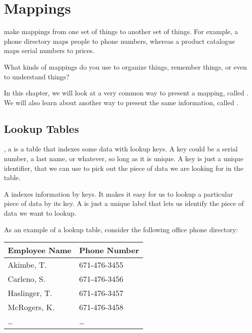 \documentclass[../../../main.tex]{subfiles}
\begin{document}
\chapter{Mappings}

 make mappings from one set of things to another set of things. For example, a phone directory maps people to phone numbers, whereas a product catalogue maps serial numbers to prices.

\begin{ponder}
  What kinds of mappings do you use to organize things, remember things, or even to understand things?
\end{ponder}

In this chapter, we will look at a very common way to present a mapping, called . We will also learn about another way to present the same information, called .


\section{Lookup Tables}

, a  is a table that indexes some data with lookup keys. A key could be a serial number, a last name, or whatever, so long as it is unique. A key is just a unique identifier, that we can use to pick out the piece of data we are looking for in the table.

\begin{terminology}
  A  indexes information by keys. It makes it easy for us to lookup a particular piece of data by its key. A  is just a unique label that lets us identify the piece of data we want to lookup.
\end{terminology}

As an example of a lookup table, consider the following office phone directory:

\begin{center}
  \begin{tabular}{| l | l |}
    \hline
    \textbf{Employee Name} & \textbf{Phone Number} \\ \hline
    Akimbe, T. & 671-476-3455 \\ \hline
    Carleno, S. & 671-476-3456 \\ \hline
    Haslinger, T. & 671-476-3457 \\ \hline
    McRogers, K. & 671-476-3458 \\ \hline
    \ldots & \ldots \\ \hline
    
  \end{tabular}
\end{center}
\end{document}
